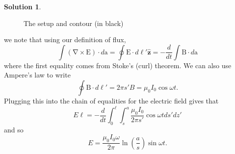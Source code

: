 \documentclass[10pt]{article}
\theoremstyle{definition}
\newtheorem{soln}{Solution}
\newcommand{\uz}{\hat{\mathbf{z}}}
\renewcommand{\curl}[1]{\bv{\nabla}\times #1}
\newcommand{\bv}[1]{\bm{\mathrm{#1}}}
\begin{document}
\begin{soln}
\begin{enumerate}[label=(\alph*)]
\begin{figure}[h]
            \caption{The setup and contour (in black)}
          \end{figure}

          we note that using our definition of flux,
          $$\int (\curl{\bv{E}})\cdot d\bv{a}=\oint \bv{E}\cdot d\ell'\uz=-\frac{d}{dt}\int \bv{B}\cdot d\bv{a}$$
          where the first equality comes from Stoke's (curl) theorem. We can also use Ampere's law to write
          $$\oint \bv{B}\cdot d\bv{\ell}'=2\pi s' B=\mu_0 I_0\cos\omega t.$$
          Plugging this into the chain of equalities for the electric field gives that
          $$E\ell=-\frac{d}{dt}\int_0^\ell\int_s^a \frac{\mu_0 I_0}{2\pi s'}\cos\omega t ds'dz'$$
          and so
          $$E=\frac{\mu_0 I_0 \omega}{2\pi}\ln\left(\frac{a}{s}\right)\sin\omega t.$$
  \end{enumerate}
\end{soln}
\newpage 
\end{document}
